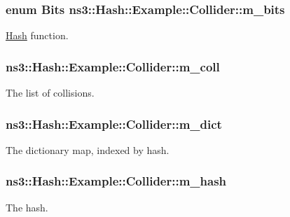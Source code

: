 \subsubsection[{\texorpdfstring{m\+\_\+bits}{m_bits}}]{\setlength{\rightskip}{0pt plus 5cm}enum {\bf Bits} ns3\+::\+Hash\+::\+Example\+::\+Collider\+::m\+\_\+bits\hspace{0.3cm}{\ttfamily [private]}}\hypertarget{classns3_1_1Hash_1_1Example_1_1Collider_aba2c13c78c36c9bae1b36740d27af746}{}\label{classns3_1_1Hash_1_1Example_1_1Collider_aba2c13c78c36c9bae1b36740d27af746}
\hyperlink{namespacens3_1_1Hash}{Hash} function. 
\subsubsection[{\texorpdfstring{m\+\_\+coll}{m_coll}}]{ ns3\+::\+Hash\+::\+Example\+::\+Collider\+::m\+\_\+coll\hspace{0.3cm}{\ttfamily [private]}}\hypertarget{classns3_1_1Hash_1_1Example_1_1Collider_a7076954f471121480c71827a60e69af9}{}\label{classns3_1_1Hash_1_1Example_1_1Collider_a7076954f471121480c71827a60e69af9}
The list of collisions. 
\subsubsection[{\texorpdfstring{m\+\_\+dict}{m_dict}}]{ ns3\+::\+Hash\+::\+Example\+::\+Collider\+::m\+\_\+dict\hspace{0.3cm}{\ttfamily [private]}}\hypertarget{classns3_1_1Hash_1_1Example_1_1Collider_aeb8e300bae7fd86e48749e83cda290ef}{}\label{classns3_1_1Hash_1_1Example_1_1Collider_aeb8e300bae7fd86e48749e83cda290ef}
The dictionary map, indexed by hash. 
\subsubsection[{\texorpdfstring{m\+\_\+hash}{m_hash}}]{ ns3\+::\+Hash\+::\+Example\+::\+Collider\+::m\+\_\+hash}\hypertarget{classns3_1_1Hash_1_1Example_1_1Collider_a05ce889c89d4ccb89ad600126d00b04c}{}\label{classns3_1_1Hash_1_1Example_1_1Collider_a05ce889c89d4ccb89ad600126d00b04c}
The hash. 
